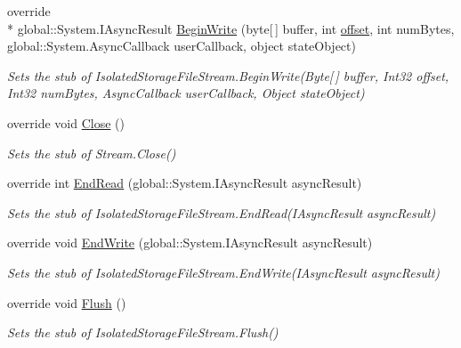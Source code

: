 \begin{DoxyCompactItemize}
override \\*
global\-::\-System.\-I\-Async\-Result \hyperlink{class_system_1_1_i_o_1_1_isolated_storage_1_1_fakes_1_1_stub_isolated_storage_file_stream_ad267538617512d9a2ad40c8a2cf7d2a0}{Begin\-Write} (byte\mbox{[}$\,$\mbox{]} buffer, int \hyperlink{jquery-1_810_82_8js_a4a9f594d20d927164551fc7fa4751a2f}{offset}, int num\-Bytes, global\-::\-System.\-Async\-Callback user\-Callback, object state\-Object)
\begin{DoxyCompactList}\small\item\em Sets the stub of Isolated\-Storage\-File\-Stream.\-Begin\-Write(\-Byte\mbox{[}$\,$\mbox{]} buffer, Int32 offset, Int32 num\-Bytes, Async\-Callback user\-Callback, Object state\-Object)\end{DoxyCompactList}\item 
override void \hyperlink{class_system_1_1_i_o_1_1_isolated_storage_1_1_fakes_1_1_stub_isolated_storage_file_stream_a0971a317a483f1d5ee0e25771e564697}{Close} ()
\begin{DoxyCompactList}\small\item\em Sets the stub of Stream.\-Close()\end{DoxyCompactList}\item 
override int \hyperlink{class_system_1_1_i_o_1_1_isolated_storage_1_1_fakes_1_1_stub_isolated_storage_file_stream_a1ddc7d1186c5d38873b40db7f02f67ba}{End\-Read} (global\-::\-System.\-I\-Async\-Result async\-Result)
\begin{DoxyCompactList}\small\item\em Sets the stub of Isolated\-Storage\-File\-Stream.\-End\-Read(\-I\-Async\-Result async\-Result)\end{DoxyCompactList}\item 
override void \hyperlink{class_system_1_1_i_o_1_1_isolated_storage_1_1_fakes_1_1_stub_isolated_storage_file_stream_af1ab222e2b9d0a3fb1b43c6568c5d3b6}{End\-Write} (global\-::\-System.\-I\-Async\-Result async\-Result)
\begin{DoxyCompactList}\small\item\em Sets the stub of Isolated\-Storage\-File\-Stream.\-End\-Write(\-I\-Async\-Result async\-Result)\end{DoxyCompactList}\item 
override void \hyperlink{class_system_1_1_i_o_1_1_isolated_storage_1_1_fakes_1_1_stub_isolated_storage_file_stream_a785c9cc3dc59c8e01599a8d55c761daa}{Flush} ()
\begin{DoxyCompactList}\small\item\em Sets the stub of Isolated\-Storage\-File\-Stream.\-Flush()\end{DoxyCompactList}\item 

\end{DoxyCompactItemize}
